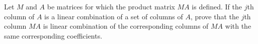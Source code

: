 Let $M$ and $A$ be matrices for which the product matrix $MA$ is
defined. If the $j$th column of $A$ is a linear combination of a set
of columns of $A$, prove that the $j$th column $MA$ is linear
combination of the corresponding columns of $MA$ with the same
corresponding coefficients.
